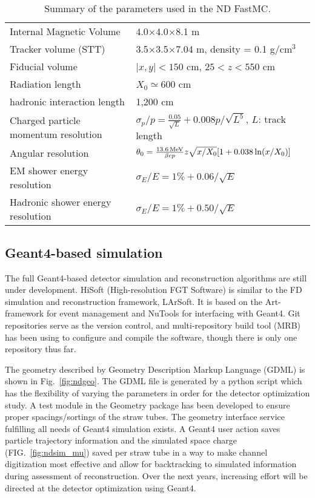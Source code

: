 \begin{table}[!tb]
  \begin{center}
    \caption{Summary of the parameters used in the ND FastMC.}
    \label{tab:ndfastmc_par}
    \begin{tabular}{l|l} \hline\hline
      Internal Magnetic Volume & 4.0$\times$4.0$\times$8.1 m\\
      Tracker volume (STT) & 3.5$\times$3.5$\times$7.04 m, density = 0.1 g/cm$^3$\\
      Fiducial volume & $|x,y|<150$ cm, $25<z<550$ cm \\
      Radiation length & $X_0\simeq 600$ cm \\
      hadronic interaction length & 1,200 cm\\
      Charged particle momentum resolution & $\sigma_p/p=\frac{0.05}{\sqrt{L}}+0.008p/\sqrt{L^5}$, $L$: track length\\
      Angular resolution & $\theta_0=\frac{13.6{\,\rm {MeV}}}{\beta cp}z\sqrt{x/X_0}[1+0.038\ln(x/X_0)]$\\
      EM shower energy resolution & $\sigma_E/E=1\%+0.06/\sqrt{E}$\\
      Hadronic shower energy resolution &  $\sigma_E/E=1\%+0.50/\sqrt{E}$\\ \hline\hline
    \end{tabular}
  \end{center}
  \end{table}

\subsection{Geant4-based simulation}
The full Geant4-based detector simulation and reconstruction algorithms are still under development.
HiSoft (High-resolution FGT Software) is similar to the FD simulation and reconstruction framework, LArSoft.
It is based on the Art-framework for event management and NuTools for interfacing with Geant4. Git repositories
serve as the version control, and multi-repository build tool (MRB) has been using to configure and 
compile the software, though there is only one repository thus far.

The geometry described by Geometry Description Markup Language (GDML) is shown in Fig.~\ref{fig:ndgeo}.
The GDML file is generated by a python script which has the flexibility of varying the parameters in order
for the detector optimization study. A test module in the Geometry package has been developed to ensure
proper spacings/sortings of the straw tubes. The geometry interface service fulfilling all needs of
Geant4 simulation exists. A Geant4 user action saves particle trajectory information and the simulated space 
charge (FIG.~\ref{fig:ndsim_mu}) saved per straw tube in a way to make channel digitization most effective and allow for 
backtracking to simulated information during assessment of reconstruction. 
Over the next years, increasing effort will be directed at the detector optimization using Geant4.

